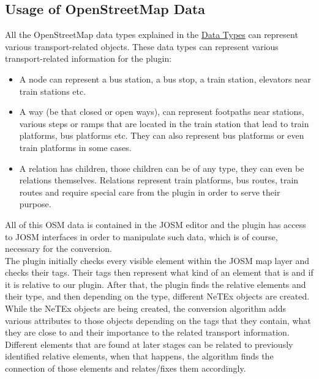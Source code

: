 \subsection{Usage of OpenStreetMap Data}
All the OpenStreetMap data types explained in the \hyperref[sec:OSMDataTypes]{Data Types} can represent various transport-related objects. These data types can represent various transport-related information for the plugin:
\begin{itemize}
	\item {A node can represent a bus station, a bus stop, a train station, elevators near train stations etc. }
	\item {A way (be that closed or open ways), can represent footpaths near stations, various steps or ramps that are located in the train station that lead to train platforms, bus platforms etc. They can also represent bus platforms or even train platforms in some cases.}
	\item {A relation has children, those children can be of any type, they can even be relations themselves. Relations represent train platforms, bus routes, train routes and require special care from the plugin in order to serve their purpose.}
\end{itemize}
All of this OSM data is contained in the JOSM editor and the plugin has access to JOSM interfaces in order to manipulate such data, which is of course, necessary for the conversion.\\
The plugin initially checks every visible element within the JOSM map layer and checks their tags. Their tags then represent what kind of an element that is and if it is relative to our plugin. After that, the plugin finds the relative elements and their type, and then depending on the type, different NeTEx objects are created. While the NeTEx objects are being created, the conversion algorithm adds various attributes to those objects depending on the tags that they contain, what they are close to and their importance to the related transport information. Different elements that are found at later stages can be related to previously identified relative elements, when that happens, the algorithm finds the connection of those elements and relates/fixes them accordingly.
